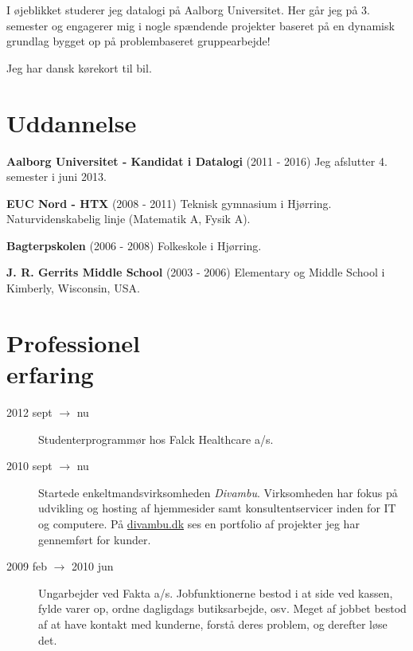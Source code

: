 \documentclass[margin,line,a4paper]{resume}
\begin{document}
\begin{resume}
    I øjeblikket studerer jeg datalogi på Aalborg Universitet. Her går
    jeg på 3. semester og engagerer mig i nogle spændende
    projekter baseret på en dynamisk grundlag bygget op på problembaseret gruppearbejde!

    Jeg har dansk kørekort til bil.

    \section{\mysidestyle Uddannelse} \textbf{Aalborg Universitet - Kandidat i Datalogi}
    (2011 - 2016) Jeg afslutter 4. semester i juni 2013.

    \textbf{EUC Nord - HTX} (2008 - 2011) Teknisk gymnasium i Hjørring. Naturvidenskabelig
    linje (Matematik A, Fysik A).

    \textbf{Bagterpskolen} (2006 - 2008) Folkeskole i Hjørring.

    \textbf{J. R. Gerrits Middle School}
    (2003 - 2006) Elementary og Middle School i Kimberly,
    Wisconsin, USA.

\section{\mysidestyle Professionel\\erfaring}\vspace{1mm}
\begin{description}

  \item[2012 sept $\rightarrow$ nu] Studenterprogrammør hos Falck Healthcare a/s.


  \item[2010 sept $\rightarrow$ nu] Startede enkeltmandsvirksomheden
    \emph{Divambu}. Virksomheden har fokus på udvikling og hosting af
    hjemmesider samt konsultentservicer inden for IT og computere. På
    \url{divambu.dk} ses en portfolio af projekter jeg har gennemført
    for kunder.

  \item[2009 feb $\rightarrow$ 2010 jun] Ungarbejder ved Fakta
    a/s. Jobfunktionerne bestod i at side ved kassen, fylde varer op,
    ordne dagligdags butiksarbejde, osv. Meget af jobbet bestod af at have
    kontakt med kunderne, forstå deres problem, og derefter løse det.

\end{description}
\pagebreak


\end{resume}
\end{document}
